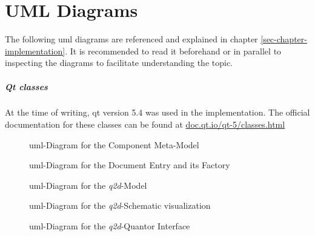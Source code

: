 

\chapter{UML Diagrams}
	\label{sec-appendix-uml}
	The following \gls{uml} diagrams are referenced and explained in chapter \ref{sec-chapter-implementation}.
	It is recommended to read it beforehand or in parallel to inspecting the diagrams to facilitate understanding the topic.
	
	\paragraph{Qt classes}
	At the time of writing, \gls{qt} version 5.4 was used in the implementation.
	The official documentation for these classes can be found at \url{doc.qt.io/qt-5/classes.html}
	
\pagebreak


	\begin{sidewaysfigure}
		\centering
		\resizebox{\textheight}{!}{
		 
		}
		\caption{\gls{uml}-Diagram for the Component Meta-Model}
		\label{fig-class-diagram-metamodel}
	\end{sidewaysfigure}

	\begin{sidewaysfigure}
		\centering
		\resizebox{\textheight}{!}{
		 
		}
		\caption{\gls{uml}-Diagram for the Document Entry and its Factory}
		\label{fig-class-diagram-documentEntry}
	\end{sidewaysfigure}		

	\begin{sidewaysfigure}
		\centering
		\resizebox{\textheight}{!}{
		 
		}
		\caption{\gls{uml}-Diagram for the \emph{q2d}-Model}
		\label{fig-class-diagram-model}
	\end{sidewaysfigure}

	\begin{sidewaysfigure}
		\centering
		\resizebox{\textheight}{!}{
		 
		}
		\caption{\gls{uml}-Diagram for the \emph{q2d}-Schematic visualization}
		\label{fig-class-diagram-schematic}
	\end{sidewaysfigure}
	
		\begin{sidewaysfigure}
		\centering
		\resizebox{\textheight}{!}{
		 
		}
		\caption{\gls{uml}-Diagram for the \emph{q2d}-Quantor Interface}
		\label{fig-class-diagram-quantor}
	\end{sidewaysfigure}